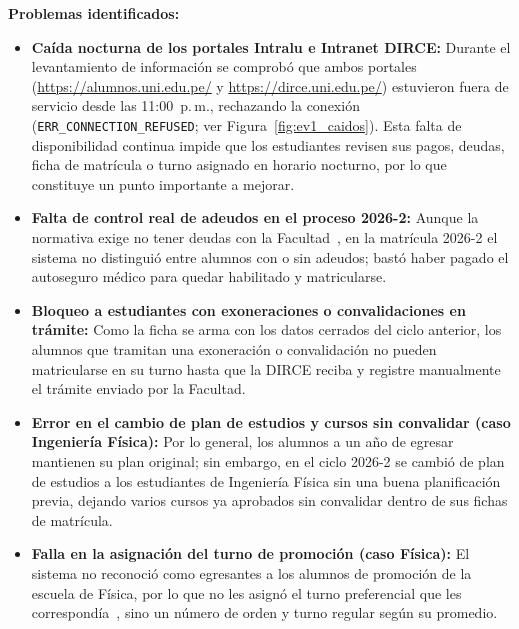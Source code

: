 \textbf{Problemas identificados:}
\begin{itemize}
    \item \textbf{Caída nocturna de los portales Intralu e Intranet DIRCE:} Durante el levantamiento de información se comprobó que ambos portales (\url{https://alumnos.uni.edu.pe/} y \url{https://dirce.uni.edu.pe/}) estuvieron fuera de servicio desde las 11:00~p.\,m., rechazando la conexión (\texttt{ERR\_CONNECTION\_REFUSED}; ver Figura~\ref{fig:ev1_caidos}). Esta falta de disponibilidad continua impide que los estudiantes revisen sus pagos, deudas, ficha de matrícula o turno asignado en horario nocturno, por lo que constituye un punto importante a mejorar.
    \item \textbf{Falta de control real de adeudos en el proceso 2026-2:} Aunque la normativa exige no tener deudas con la Facultad~\cite[Nota~1]{tupa2024}, en la matrícula 2026-2 el sistema no distinguió entre alumnos con o sin adeudos; bastó haber pagado el autoseguro médico para quedar habilitado y matricularse.
    \item \textbf{Bloqueo a estudiantes con exoneraciones o convalidaciones en trámite:} Como la ficha se arma con los datos cerrados del ciclo anterior, los alumnos que tramitan una exoneración o convalidación no pueden matricularse en su turno hasta que la DIRCE reciba y registre manualmente el trámite enviado por la Facultad.
    \item \textbf{Error en el cambio de plan de estudios y cursos sin convalidar (caso Ingeniería Física):} Por lo general, los alumnos a un año de egresar mantienen su plan original; sin embargo, en el ciclo 2026-2 se cambió de plan de estudios a los estudiantes de Ingeniería Física sin una buena planificación previa, dejando varios cursos ya aprobados sin convalidar dentro de sus fichas de matrícula.
    \item \textbf{Falla en la asignación del turno de promoción (caso Física):} El sistema no reconoció como egresantes a los alumnos de promoción de la escuela de Física, por lo que no les asignó el turno preferencial que les correspondía~\cite[Art.~42\textdegree{}]{reglamento2022}, sino un número de orden y turno regular según su promedio.
\end{itemize}
